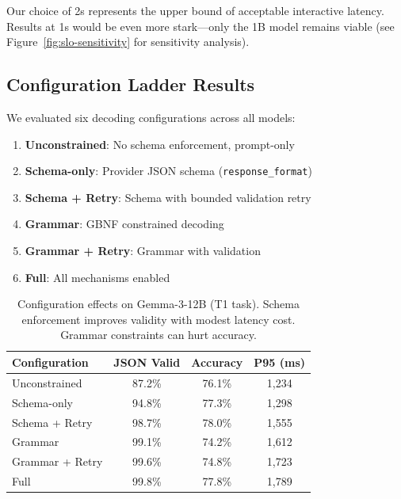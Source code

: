 \documentclass[11pt]{article}
\begin{document}
Our choice of 2s represents the upper bound of acceptable interactive latency.
Results at 1s would be even more stark---only the 1B model remains viable (see Figure~\ref{fig:slo-sensitivity} for sensitivity analysis).

\subsection{Configuration Ladder Results}

We evaluated six decoding configurations across all models:
\begin{enumerate}[leftmargin=12pt]
    \item \textbf{Unconstrained}: No schema enforcement, prompt-only
    \item \textbf{Schema-only}: Provider JSON schema (\texttt{response\_format})
    \item \textbf{Schema + Retry}: Schema with bounded validation retry
    \item \textbf{Grammar}: GBNF constrained decoding
    \item \textbf{Grammar + Retry}: Grammar with validation
    \item \textbf{Full}: All mechanisms enabled
\end{enumerate}

\begin{table}[t]
\centering
\caption{Configuration effects on Gemma-3-12B (T1 task). Schema enforcement improves validity with modest latency cost. Grammar constraints can hurt accuracy.}
\label{tab:config-ladder}
\begin{tabular}{lccc}
\toprule
\textbf{Configuration} & \textbf{JSON Valid} & \textbf{Accuracy} & \textbf{P95 (ms)} \\
\midrule
Unconstrained & 87.2\% & 76.1\% & 1,234 \\
Schema-only & 94.8\% & 77.3\% & 1,298 \\
Schema + Retry & 98.7\% & 78.0\% & 1,555 \\
Grammar & 99.1\% & 74.2\% & 1,612 \\
Grammar + Retry & 99.6\% & 74.8\% & 1,723 \\
Full & 99.8\% & 77.8\% & 1,789 \\
\bottomrule
\end{tabular}
\end{table}
\end{document}
